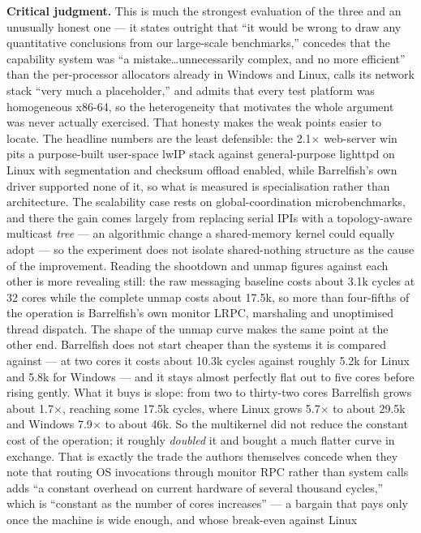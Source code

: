 \textbf{Critical judgment.} This is much the strongest evaluation of the three and an
unusually honest one --- it states outright that ``it would be wrong to draw any quantitative
conclusions from our large-scale benchmarks,'' concedes that the capability system was ``a
mistake\ldots unnecessarily complex, and no more efficient'' than the per-processor allocators
already in Windows and Linux, calls its network stack ``very much a placeholder,'' and admits
that every test platform was homogeneous x86-64, so the heterogeneity that motivates the
whole argument was never actually exercised. That honesty makes the weak points easier to
locate. The headline numbers are the least defensible: the 2.1$\times$ web-server win pits a
purpose-built user-space lwIP stack against general-purpose lighttpd on Linux with
segmentation and checksum offload enabled, while Barrelfish's own driver supported none of
it, so what is measured is specialisation rather than architecture. The scalability case
rests on global-coordination microbenchmarks, and there the gain comes largely from replacing
serial IPIs with a topology-aware multicast \emph{tree} --- an algorithmic change a
shared-memory kernel could equally adopt --- so the experiment does not isolate shared-nothing
structure as the cause of the improvement. Reading the shootdown and unmap figures against
each other is more revealing still: the raw messaging baseline costs about 3.1k cycles at 32
cores while the complete unmap costs about 17.5k, so more than four-fifths of the operation is
Barrelfish's own monitor LRPC, marshaling and unoptimised thread dispatch. The shape of the
unmap curve makes the same point at the other end. Barrelfish does not start cheaper than the
systems it is compared against --- at two cores it costs about 10.3k cycles against roughly
5.2k for Linux and 5.8k for Windows --- and it stays almost perfectly flat out to five cores
before rising gently. What it buys is slope: from two to thirty-two cores Barrelfish grows
about 1.7$\times$, reaching some 17.5k cycles, where Linux grows 5.7$\times$ to about 29.5k
and Windows 7.9$\times$ to about 46k. So the multikernel did not reduce the constant cost of
the operation; it roughly \emph{doubled} it and bought a much flatter curve in exchange. That
is exactly the trade the authors themselves concede when they note that routing OS invocations
through monitor RPC rather than system calls adds ``a constant overhead on current hardware of
several thousand cycles,'' which is ``constant as the number of cores increases'' --- a
bargain that pays only once the machine is wide enough, and whose break-even against Linux
